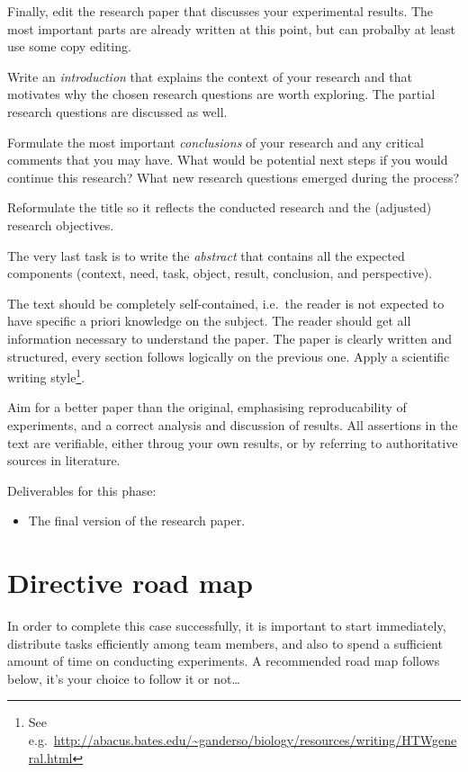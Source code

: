 \documentclass[fleqn,10pt]{artikeltin}
\begin{document}
Finally, edit the research paper that discusses your experimental results. The most important parts are already written at this point, but can probalby at least use some copy editing.

Write an \emph{introduction} that explains the context of your research and that motivates why the chosen research questions are worth exploring. The partial research questions are discussed as well.

Formulate the most important \emph{conclusions} of your research and any critical comments that you may have. What would be potential next steps if you would continue this research? What new research questions emerged during the process?

Reformulate the title so it reflects the conducted research and the (adjusted) research objectives.

The very last task is to write the \emph{abstract} that contains all the expected components (context, need, task, object, result, conclusion, and perspective).

The text should be completely self-contained, i.e.~the reader is not expected to have specific a priori knowledge on the subject. The reader should get all information necessary to understand the paper. The paper is clearly written and structured, every section follows logically on the previous one. Apply a scientific writing style\footnote{See e.g.~\url{http://abacus.bates.edu/~ganderso/biology/resources/writing/HTWgeneral.html}}.

Aim for a better paper than the original, emphasising reproducability of experiments, and a correct analysis and discussion of results. All assertions in the text are verifiable, either throug your own results, or by referring to authoritative sources in literature.

Deliverables for this phase:

\begin{itemize}
	\item The final version of the research paper.
\end{itemize}

\section{Directive road map}
\label{sec:roadmap}

In order to complete this case successfully, it is important to start immediately, distribute tasks efficiently among team members, and also to spend a sufficient amount of time on conducting experiments. A recommended road map follows below, it's your choice to follow it or not\ldots
\end{document}
